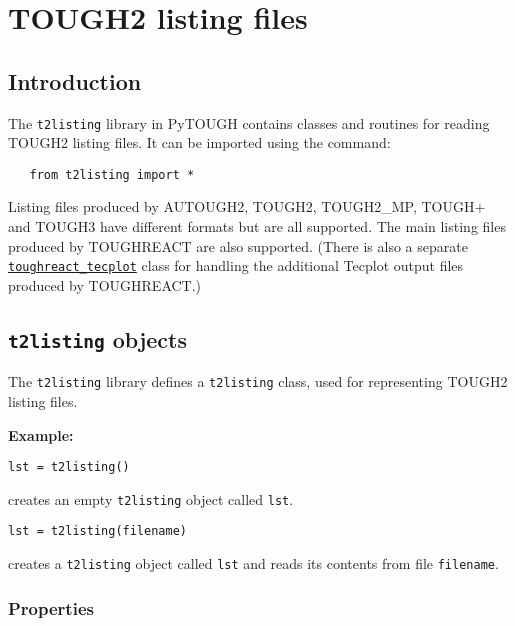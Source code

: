 \chapter{TOUGH2 listing files}
\label{listingfiles}

\section{Introduction}
The \texttt{t2listing} library in PyTOUGH contains classes and routines for reading TOUGH2 listing files.  It can be imported using the command:

\begin{lstlisting}
   from t2listing import *
\end{lstlisting}


Listing files produced by AUTOUGH2, TOUGH2, TOUGH2\_MP, TOUGH+ and TOUGH3 have different formats but are all supported.  The main listing files produced by TOUGHREACT are also supported. (There is also a separate \hyperref[toughreact_tecplot]{\texttt{toughreact\_tecplot}} class for handling the additional Tecplot output files produced by TOUGHREACT.)

\section{\texttt{t2listing} objects}

The \texttt{t2listing} library defines a \texttt{t2listing} class, used for representing TOUGH2 listing files.

\textbf{Example:}

\begin{lstlisting}
lst = t2listing()
\end{lstlisting}

creates an empty \texttt{t2listing} object called \texttt{lst}.

\begin{lstlisting}
lst = t2listing(filename)
\end{lstlisting}

creates a \texttt{t2listing} object called \texttt{lst} and reads its contents from file \texttt{filename}.

\subsection{Properties}
\label{t2listing_properties}

